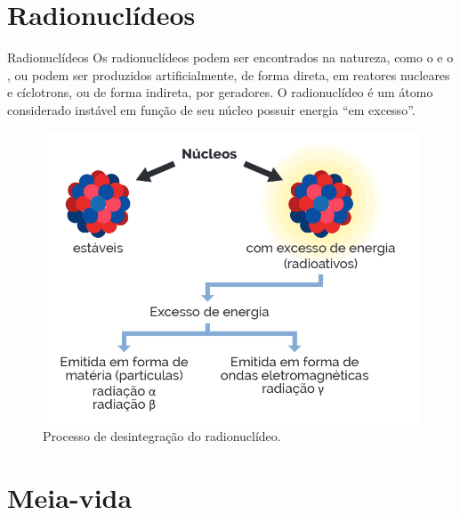 \documentclass[presentation,professionalfonts,aspectratio=169]{beamer}
\begin{document}
\section{Radionuclídeos}
\label{sec:org7172346}

\begin{frame}[label={sec:orgb820454}]{Radionuclídeos}
Os radionuclídeos podem ser encontrados na natureza, como o   e o , ou podem ser produzidos artificialmente, de forma direta, em reatores nucleares e cíclotrons, ou de forma indireta, por geradores. O radionuclídeo é um átomo considerado instável em função de seu núcleo possuir energia “em excesso”.

\begin{figure}[H]
\centering
\includegraphics[scale=0.24]{FQ/Radioatividade/nucleo.png}
\caption{\label{fig:org69849c8}Processo de desintegração do radionuclídeo.}
\end{figure}
\end{frame}


\section{Meia-vida}
\label{sec:orgd34e231}
\end{document}
